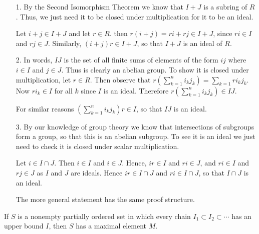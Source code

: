 \documentclass[12pt,letterpaper]{algebra_book}
\theoremstyle{definition}
\begin{document}
    \begin{prf}
        \begin{itemize}
            \item[1.] 
            By the Second Isomorphism Theorem we know that $I + J$
            is a subring of $R$. Thus, we just need it to be
            closed under multiplication for it to be an ideal. 

            Let $i + j \in I + J$ and let $r \in R$.
            then $r(i + j) = ri +rj \in I + J$, since $ri \in I$
            and $rj \in J$. Similarly, $(i + j)r \in I + J$, so
            that $I + J$ is an ideal of $R$.

            \item[2.] In words, $IJ$ is the set of all finite sums
            of elements of the form $ij$ where $i \in I$ and $j
            \in J$. Thus is clearly an abelian group. To show it
            is closed under multiplication, let $r \in R$. Then
            observe that $r(\sum_{k=1}^{n}i_kj_k) =
            \sum_{k=1}ri_kj_k$. 
            Now $ri_k \in I$ for all $k$ since $I$ is an ideal.
            Therefore $r(\sum_{k=1}^{n}i_kj_k) \in IJ$. 

            For similar reasons $(\sum_{k=1}^{n}i_kj_k)r \in I$,
            so that $IJ$ is an ideal. 

            \item[3.] By our knowledge of
            group theory we know that intersections of subgroups
            form a group, so that this is an abelian subgroup.
            To see it is an ideal we just need to check it is
            closed under scalar multiplication. 

            Let $i \in I \cap J$. Then $i \in I$ and $i \in J$.
            Hence, $ir \in I$ and $ri \in J$, and $ri \in I$ and
            $rj \in J$ as $I$ and $J$ are ideals. Hence $ir \in I
            \cap J$ and $ri \in I \cap J$, so that $I \cap J$ is
            an ideal. 

            The more general statement has the same proof structure.
        \end{itemize}
    \end{prf}


    \begin{lemma}
    If $S$ is a nonempty
    partially ordered set in which every chain $I_1 \subset I_2
    \subset \cdots$ has an upper bound $I$, then $S$ has a maximal
    element $M$.
    \end{lemma}
\end{document}
